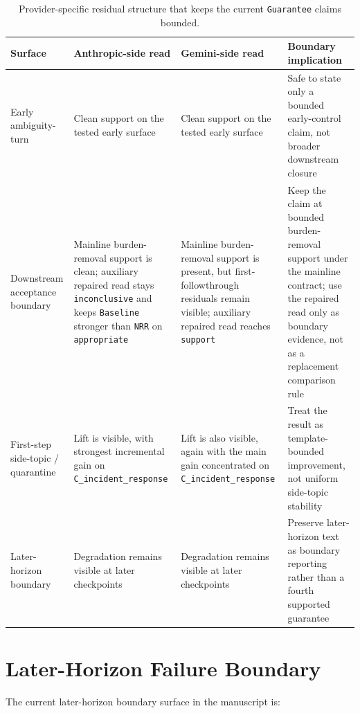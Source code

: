 \documentclass[11pt]{article}
\begin{document}
\begin{table}[ht]
\centering
\begin{tabular}{|p{}|p{}|p{}|p{}|}
\hline
\textbf{Surface} & \textbf{Anthropic-side read} & \textbf{Gemini-side read} & \textbf{Boundary implication} \\
\hline
Early ambiguity-turn & Clean support on the tested early surface & Clean support on the tested early surface & Safe to state only a bounded early-control claim, not broader downstream closure \\
\hline
Downstream acceptance boundary & Mainline burden-removal support is clean; auxiliary repaired read stays \texttt{inconclusive} and keeps \texttt{Baseline} stronger than \texttt{NRR} on \texttt{appropriate} & Mainline burden-removal support is present, but first-followthrough residuals remain visible; auxiliary repaired read reaches \texttt{support} & Keep the claim at bounded burden-removal support under the mainline contract; use the repaired read only as boundary evidence, not as a replacement comparison rule \\
\hline
First-step side-topic / quarantine & Lift is visible, with strongest incremental gain on \texttt{C\_incident\_response} & Lift is also visible, again with the main gain concentrated on \texttt{C\_incident\_response} & Treat the result as template-bounded improvement, not uniform side-topic stability \\
\hline
Later-horizon boundary & Degradation remains visible at later checkpoints & Degradation remains visible at later checkpoints & Preserve later-horizon text as boundary reporting rather than a fourth supported guarantee \\
\hline
\end{tabular}
\caption{Provider-specific residual structure that keeps the current
\texttt{Guarantee} claims bounded.}
\end{table}

\section{Later-Horizon Failure Boundary}

The current later-horizon boundary surface in the manuscript is:
\end{document}
